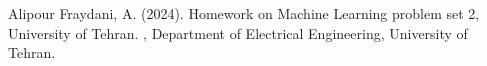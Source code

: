 \documentclass[DIV=calc, paper=a4, fontsize=11pt, twocolumn]{scrartcl}	 %
\begin{document}

\begin{thebibliography}{99} %

  Alipour Fraydani, A. (2024).
  \newblock Homework on Machine Learning problem set 2, University of Tehran.
  , Department of Electrical Engineering, University of Tehran.
  
\end{thebibliography}

\end{document}
